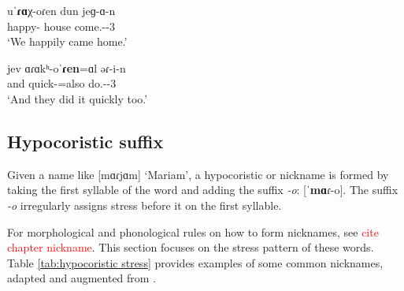 \begin{exe}
	\ex \label{ex:stress:prestress:adv sentce}
	\begin{xlist}
		\ex \gll uˈ\textbf{ɾɑ}χ-oɾen dun jeɡ-ɑ-n
		\\
		happy-{\advz} house come.{\aorperf}-{\pst}-3{\pl}
		\\
		\trans `We happily came home.' 
		\\
		
		\ex \gll jev ɑɾɑkʰ-oˈ\textbf{ɾen}=ɑl əɾ-i-n
		\\
		and quick-{\advz}=also do.{\aorperf}-{\pst}-3{\pl}
		\\
		\trans `And they did it quickly too.'
		\\
	\end{xlist}
	
\end{exe}
\subsection{Hypocoristic suffix}\label{section:stress:prestress:hypocoristic}
Given a name like [mɑɾjɑm] `Mariam', a hypocoristic or nickname is formed by taking the first syllable of the word and adding the suffix \textit{-o}: [ˈ\textbf{mɑ}ɾ-o].   The suffix \textit{-o} irregularly assigns stress before it on the first syllable. 

For morphological and phonological rules on how to form nicknames, see \textcolor{red}{cite chapter nickname}. This section focuses on the stress pattern of these words. Table \ref{tab:hypocoristic stress} provides examples of some common nicknames, adapted and augmented from   \citep[247]{Vaux-1998-ArmenianPhono}.

